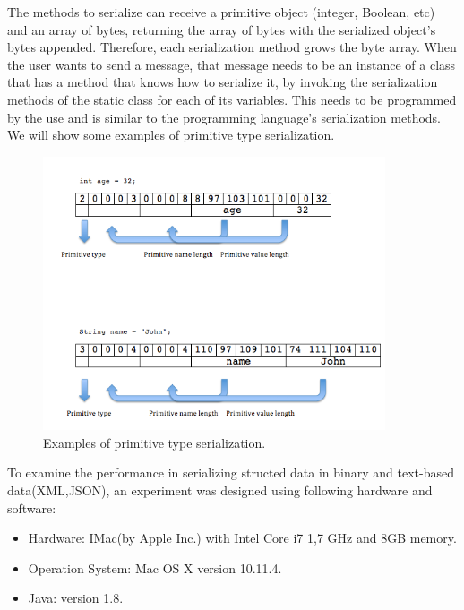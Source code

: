 The methods to serialize can receive a primitive object (integer, Boolean, etc) and an array of bytes, returning the array of bytes with the serialized object’s bytes appended. Therefore, each serialization method grows the byte array. When the user wants to send a message, that message needs to be an instance of a class that has a method that knows how to serialize it, by invoking the serialization methods of the static class for each of its variables. This needs to be programmed by the use and is similar to the programming language’s serialization methods.\\

We will show some examples of primitive type serialization.

\begin{figure}[!htb]
  \centering
  \includegraphics[width=0.9\textwidth]{Figures/binary.png}
  \caption[Examples of primitive type serialization.]{Examples of primitive type serialization.}
  \label{fig:examplebinary}
\end{figure}

To examine the performance in serializing structed data in binary and text-based data(XML,JSON), an experiment was designed using following hardware and software:
\begin{itemize}
\item 	Hardware: IMac(by Apple Inc.) with Intel Core i7 1,7 GHz and 8GB memory.
\item 	Operation System: Mac OS X version 10.11.4.
\item 	Java: version 1.8.
\end{itemize}

